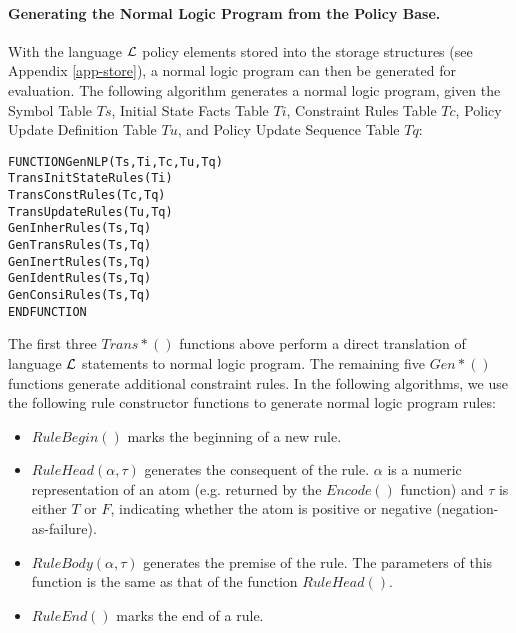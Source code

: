 \documentclass[global,twocolumn,final]{svjour}
\newenvironment{vverbatim}
  {\begin{alltt}}
  {\vspace{-\baselineskip}\end{alltt}}
\begin{document}
        \paragraph{Generating the Normal Logic Program from the Policy Base.}

          With the language ${\cal L}$ policy elements stored into the storage
          structures (see Appendix \ref{app-store}), a normal logic program can
          then be generated for evaluation. The following algorithm generates
          a normal logic program, given the Symbol Table $Ts$, Initial
          State Facts Table $Ti$, Constraint Rules Table $Tc$, Policy
          Update Definition Table $Tu$, and Policy Update Sequence Table
          $Tq$:

          \begin{vverbatim}
FUNCTION GenNLP(Ts, Ti, Tc, Tu, Tq)
  TransInitStateRules(Ti)
  TransConstRules(Tc, Tq)
  TransUpdateRules(Tu, Tq)
  GenInherRules(Ts, Tq)
  GenTransRules(Ts, Tq)
  GenInertRules(Ts, Tq)
  GenIdentRules(Ts, Tq)
  GenConsiRules(Ts, Tq)
ENDFUNCTION
          \end{vverbatim}

          The first three $Trans*()$ functions above perform a direct
          translation of language ${\cal L}$ statements to normal logic
          program. The remaining five $Gen*()$ functions generate additional
          constraint rules. In the following algorithms, we use the following
          rule constructor functions to generate normal logic program rules:

          \begin{itemize}
            \item
              $RuleBegin()$ marks the beginning of a new rule.
            \item
              $RuleHead(\alpha, \tau)$ generates the consequent of the rule.
              $\alpha$ is a numeric representation of an atom (e.g. returned by
              the $Encode()$ function) and $\tau$ is either $T$ or $F$,
              indicating whether the atom is positive or negative
              (negation-as-failure).
            \item
              $RuleBody(\alpha, \tau)$ generates the premise of the rule. The
              parameters of this function is the same as that of the
              function $RuleHead()$.
            \item
              $RuleEnd()$ marks the end of a rule.
          \end{itemize}
\end{document}

